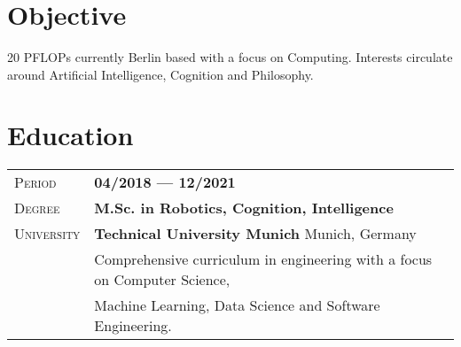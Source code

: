 \documentclass[a4paper, oneside, final]{scrartcl} %
\newcommand{\gray}{\rowcolor[gray]{.97}} %
\begin{document}
\begin{center} %


{\fontsize{36}{36}\selectfont\scshape{}} %

\vspace{1.0cm} %

\\ %
 \\ 
\vspace{0.2cm}
\href{http://www.illner.io}{\Large\faLink} \ {\LARGE\textperiodcentered} \ \href{http://www.github.com/dxlnr}{\Large\faGithub} \ {\LARGE\textperiodcentered} \ \href{https://www.linkedin.com/in/daniel-illner}{\large\faLinkedin}


\section{Objective}

20 PFLOPs currently Berlin based with a focus on Computing. Interests circulate around Artificial Intelligence, Cognition and Philosophy.


\section{Education}

\begin{tabularx}{0.97\linewidth}{>{\raggedleft\scshape}p{2cm}X}
\gray Period & \textbf{04/2018 --- 12/2021}\\
\gray Degree & \textbf{M.Sc. in Robotics, Cognition, Intelligence}\\
\gray University & \textbf{Technical University Munich} \hfill Munich, Germany\\
       & Comprehensive curriculum in engineering with a focus on Computer Science, \\
       & Machine Learning, Data Science and Software Engineering. 
\end{tabularx}


\end{center}
\end{document}
